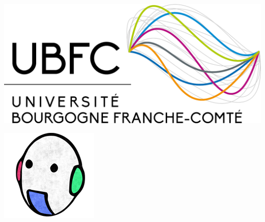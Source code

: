 \documentclass[final]{beamer}
\newlength{\colwidth}
\begin{document}
\begin{frame}[t]
\begin{columns}[t]
\begin{column}{\colwidth}
\begin{minipage}[t]{0.19\linewidth}
		\end{minipage}\hfill
		\begin{minipage}[t]{0.32\linewidth}
			\centering		
			\includegraphics[width=\linewidth]{images/logos/ubfc} 
		\end{minipage}\hfill
		\begin{minipage}[t]{0.20\linewidth}
			\includegraphics[width=\linewidth]{images/logos/vibot}
		\end{minipage}\hfill
	
	\vspace{2cm}
	

\end{column}
\end{columns}
\end{frame}
\end{document}
